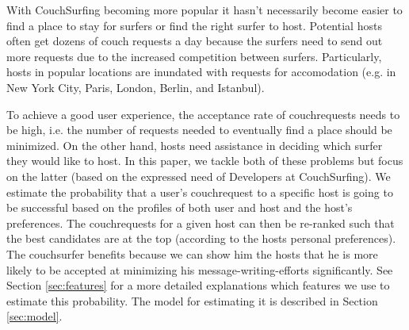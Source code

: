With CouchSurfing becoming more popular it hasn't necessarily become easier to find a place to stay for surfers or find the right surfer to host. Potential hosts often get dozens of couch requests a day because the surfers need to send out more requests due to the increased competition between surfers. Particularly, hosts in popular locations are inundated with requests for accomodation (e.g. in New York City, Paris, London, Berlin, and Istanbul).

To achieve a good user experience, the acceptance rate of couchrequests needs to be high, i.e. the number of requests needed to eventually find a place should be minimized. On the other hand, hosts need assistance in deciding which surfer they would like to host. In this paper, we tackle both of these problems but focus on the latter (based on the expressed need of Developers at CouchSurfing). We estimate the probability that a user's couchrequest to a specific host is going to be successful based on the profiles of both user and host and the host's preferences. The couchrequests for a given host can then be re-ranked such that the best candidates are at the top (according to the hosts personal preferences). The couchsurfer benefits because we can show him the hosts that he is more likely to be accepted at minimizing his message-writing-efforts significantly. See Section \ref{sec:features} for a more detailed explanations which features we use to estimate this probability. The model for estimating it is described in Section \ref{sec:model}.
